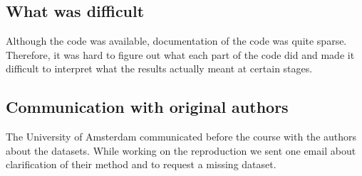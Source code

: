 
\subsection*{What was difficult}

Although the code was available, documentation of the code was quite sparse. Therefore, it was hard to figure out what each part of the code did and made it difficult to interpret what the results actually meant at certain stages. %

\subsection*{Communication with original authors}
The University of Amsterdam communicated before the course with the authors about the datasets. While working on the reproduction we sent one email about clarification of their method and to request a missing dataset.
\newpage
